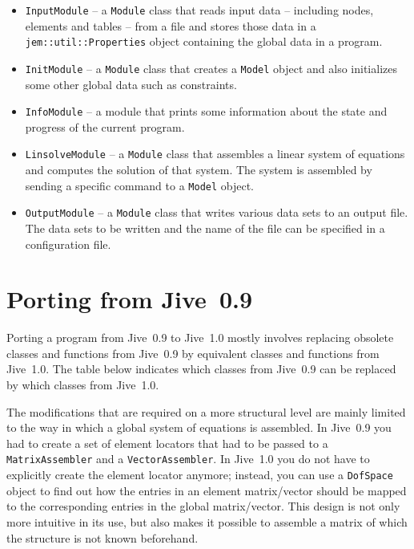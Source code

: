 \documentclass[a4paper,11pt]{article}
\newcommand{\Code}[1]{\texttt{#1}}
\begin{document}
\begin{itemize}
\item \Code{InputModule} -- a \Code{Module} class that reads input
  data -- including nodes, elements and tables -- from a file and
  stores those data in a \Code{jem::\-util::\-Properties} object
  containing the global data in a program.

\item \Code{InitModule} -- a \Code{Module} class that creates a
  \Code{Model} object and also initializes some other global data such
  as constraints.

\item \Code{InfoModule} -- a module that prints some information about
  the state and progress of the current program.

\item \Code{LinsolveModule} -- a \Code{Module} class that assembles a
  linear system of equations and computes the solution of that
  system. The system is assembled by sending a specific command to a
  \Code{Model} object.

\item \Code{OutputModule} -- a \Code{Module} class that writes various
  data sets to an output file. The data sets to be written and the
  name of the file can be specified in a configuration file.

\end{itemize}



\section{Porting from Jive~0.9}

Porting a program from Jive~0.9 to Jive~1.0 mostly involves replacing
obsolete classes and functions from Jive~0.9 by equivalent classes and
functions from Jive~1.0. The table below indicates which classes from
Jive~0.9 can be replaced by which classes from Jive~1.0.

The modifications that are required on a more structural level are
mainly limited to the way in which a global system of equations is
assembled. In Jive~0.9 you had to create a set of element locators
that had to be passed to a \Code{MatrixAssembler} and a
\Code{VectorAssembler}. In Jive~1.0 you do not have to explicitly
create the element locator anymore; instead, you can use a
\Code{DofSpace} object to find out how the entries in an element
matrix/vector should be mapped to the corresponding entries in the
global matrix/vector. This design is not only more intuitive in its
use, but also makes it possible to assemble a matrix of which the
structure is not known beforehand.
\end{document}
